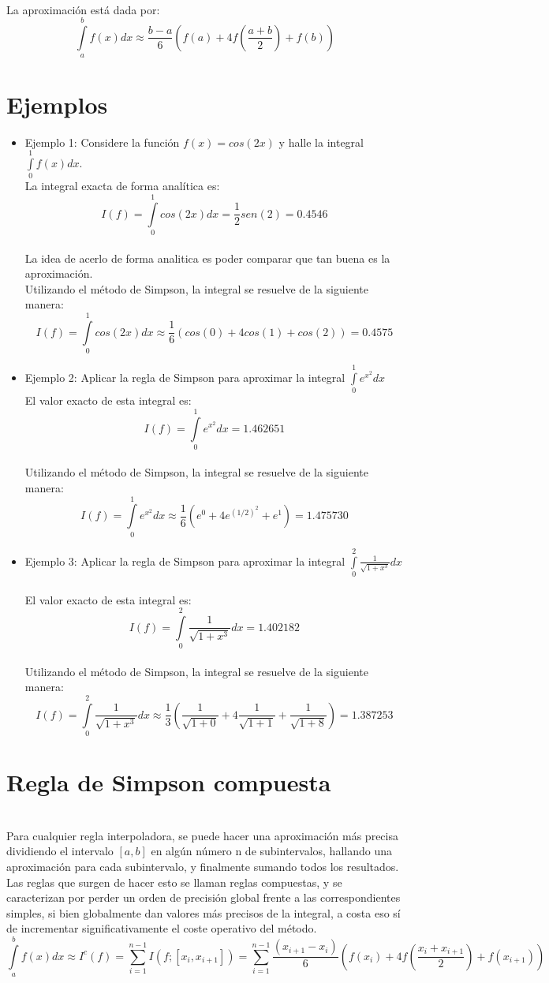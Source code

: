 \documentclass[report,oneside]{revcoles}
\begin{document}
~\\La aproximación está dada por:
$$\int\limits^{b}_{a}f(x)dx \approx \frac{b-a}{6}\left(f(a)+4f\left(\frac{a+b}{2}\right)+f(b)\right)$$

\section{Ejemplos}
\begin{itemize}
\item[]Ejemplo 1: Considere la función $f(x)=cos(2x)$ y halle la integral $\int\limits^{1}_{0} f(x)dx$.
~\\ La integral exacta de forma analítica es:
$$I(f)=\int\limits_{0}^{1}cos(2x)dx=\frac{1}{2}sen(2)=0.4546$$ 
~\\ La idea de acerlo de forma analitica es poder comparar que tan buena es la aproximación.
~\\ Utilizando el método de Simpson, la integral se resuelve de la siguiente manera:
$$I(f)=\int\limits_{0}^{1}cos(2x)dx \approx \frac{1}{6}(cos(0)+4cos(1)+cos(2))=0.4575$$
\item[]Ejemplo 2: Aplicar la regla de Simpson para aproximar la integral $\int\limits_{0}^{1}e^{x^2}dx$
~\\El valor exacto de esta integral es:
$$I(f)=\int\limits_{0}^{1}e^{x^2}dx=1.462651$$ 
~\\ Utilizando el método de Simpson, la integral se resuelve de la siguiente manera:
$$I(f)=\int\limits_{0}^{1}e^{x^2}dx \approx \frac{1}{6}(e^{0}+4 e^{(1/2)^2}+e^{1})=1.475730$$
\item[]Ejemplo 3: Aplicar la regla de Simpson para aproximar la integral $\int\limits_{0}^{2}\frac{1}{\sqrt{1+x^3}} dx$
~\\El valor exacto de esta integral es:
$$I(f)=\int\limits_{0}^{2}\frac{1}{\sqrt{1+x^3}} dx=1.402182$$
~\\Utilizando el método de Simpson, la integral se resuelve de la siguiente manera:
$$I(f)=\int\limits_{0}^{2}\frac{1}{\sqrt{1+x^3}} dx \approx \frac{1}{3} \left(\frac{1}{\sqrt{1+0}}+4\frac{1}{\sqrt{1+1}}+\frac{1}{\sqrt{1+8}}\right)=1.387253$$
\end{itemize}


\section{Regla de Simpson compuesta}
~\\Para cualquier regla interpoladora, se puede hacer una aproximación más precisa dividiendo el intervalo $[a,b]$ en algún número n de subintervalos, hallando una aproximación para cada subintervalo, y finalmente sumando todos los resultados. Las reglas que surgen de hacer esto se llaman reglas compuestas, y se caracterizan por perder un orden de precisión global frente a las correspondientes simples, si bien globalmente dan valores más precisos de la integral, a costa eso sí de incrementar significativamente el coste operativo del método.
$$\int\limits_{a}^{b}f(x)dx \approx I^{c}(f)=\sum\limits_{i=1}^{n-1}I(f;[x_{i},x_{i+1}])=\sum\limits_{i=1}^{n-1}\frac{(x_{i+1}-x_{i})}{6}\left(f(x_{i})+4f\left(\frac{x_{i}+x_{i+1}}{2} \right)+f(x_{i+1})\right)$$
\end{document}

